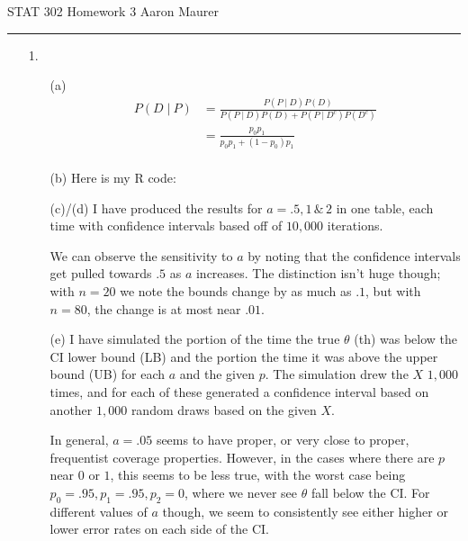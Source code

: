 \documentclass[11pt]{article}
\newcommand{\st}{ \; \big | \:}
\theoremstyle{definition}
\begin{document}
STAT 302 Homework 3 \hfill Aaron Maurer
\vspace{2mm}
\hrule
\vspace{2mm}

\begin{itemize}
    \item[1.]
        \begin{itemize}
            \item[(a)]
                \begin{align*}
                    P(D \st P) &= \frac{P(P\st D)P(D)}{P(P\st D)P(D) +  P(P\st D^c)P(D^c)} \\
                               &= \frac{p_0p_1}{p_0p_1 +  (1-p_0)p_1} \\
                \end{align*}
            \item[(b)]
                Here is my R code:
                
            \item[(c)/(d)]
                I have produced the results for $a=.5,1 \,\&\, 2$ in one table, each time with confidence intervals based off of $10,000$ iterations.
                \FloatBarrier
                
                \FloatBarrier
                We can observe the sensitivity to $a$ by noting that the confidence intervals get pulled towards $.5$ as $a$ increases. The distinction isn't huge though; with $n=20$ we note the bounds change by as much as $.1$, but with $n=80$, the change is at most near $.01$.
            \item[(e)]
                I have simulated the portion of the time the true $\theta$ (th) was below the CI lower bound (LB) and the portion the time it was above the upper bound (UB) for each $a$ and the given $p$. The simulation drew the $X$ $1,000$ times, and for each of these generated a confidence interval based on another $1,000$ random draws based on the given $X$.
                \FloatBarrier
                
                \FloatBarrier
                In general, $a=.05$ seems to have proper, or very close to proper, frequentist coverage properties. However, in the cases where there are $p$ near $0$ or $1$, this seems to be less true, with the worst case being $p_0=.95, p_1=.95, p_2=0$, where we never see $\theta$ fall below the CI. For different values of $a$ though, we seem to consistently see either higher or lower error rates on each side of the CI.

\end{itemize}
\end{itemize}
\end{document}

